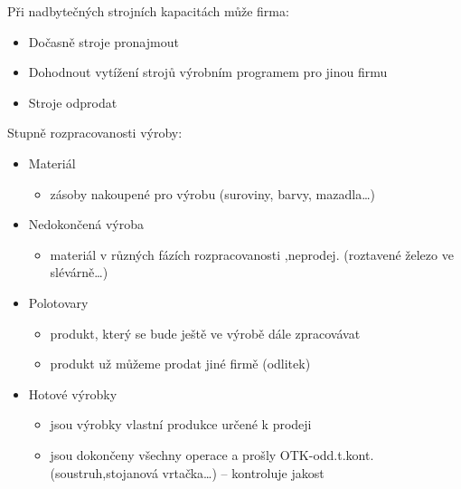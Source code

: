 Při nadbytečných strojních kapacitách může firma:
\begin{itemize}
    \item Dočasně stroje pronajmout
    \item Dohodnout vytížení strojů výrobním programem pro jinou firmu
    \item Stroje odprodat
\end{itemize}

Stupně rozpracovanosti výroby:
\begin{itemize}	
    \item Materiál
        \begin{itemize}
            \item zásoby nakoupené pro výrobu (suroviny, barvy, mazadla\ldots)
        \end{itemize}
    \item Nedokončená výroba
        \begin{itemize}
            \item materiál v různých fázích rozpracovanosti ,neprodej. (roztavené železo ve slévárně\ldots)
        \end{itemize}
    \item Polotovary
        \begin{itemize}
            \item produkt, který se bude ještě ve výrobě dále zpracovávat
            \item produkt už můžeme prodat jiné firmě (odlitek)
        \end{itemize}
    \item Hotové výrobky
        \begin{itemize}
            \item jsou výrobky vlastní produkce určené k prodeji
            \item jsou dokončeny všechny operace a prošly OTK-odd.t.kont. (soustruh,stojanová vrtačka\ldots) -- kontroluje jakost
        \end{itemize}
\end{itemize}

